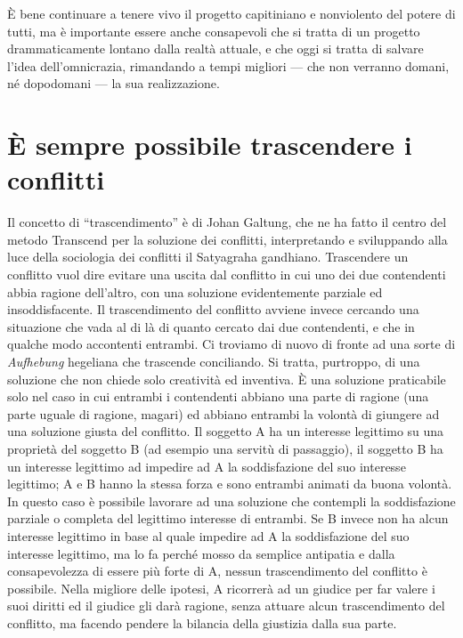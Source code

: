 \documentclass[12pt,oneside,openany]{book}
\begin{document}
È bene continuare a tenere vivo il progetto capitiniano e nonviolento del potere di tutti, ma è importante essere anche consapevoli che si tratta di un progetto drammaticamente lontano dalla realtà attuale, e che oggi si tratta di salvare l'idea dell'omnicrazia, rimandando a tempi migliori --- che non verranno domani, né dopodomani --- la sua realizzazione.

\setcounter{chapter}{8}\addtocounter{chapter}{-1}

\chapter{È sempre possibile trascendere i conflitti}

Il concetto di ``trascendimento'' è di Johan Galtung, che ne ha fatto il centro del metodo Transcend per la soluzione dei conflitti, interpretando e sviluppando alla luce della sociologia dei conflitti il Satyagraha gandhiano. Trascendere un conflitto vuol dire evitare una uscita dal conflitto in cui uno dei due contendenti abbia ragione dell'altro, con una soluzione evidentemente parziale ed insoddisfacente. Il trascendimento del conflitto avviene invece cercando una situazione che vada al di là di quanto cercato dai due contendenti, e che in qualche modo accontenti entrambi. Ci troviamo di nuovo di fronte ad una sorte di \emph{Aufhebung} hegeliana che trascende conciliando. Si tratta, purtroppo, di una soluzione che non chiede solo creatività ed inventiva. È una soluzione praticabile solo nel caso in cui entrambi i contendenti abbiano una parte di ragione (una parte uguale di ragione, magari) ed abbiano entrambi la volontà di giungere ad una soluzione giusta del conflitto. Il soggetto A ha un interesse legittimo su una proprietà del soggetto B (ad esempio una servitù di passaggio), il soggetto B ha un interesse legittimo ad impedire ad A la soddisfazione del suo interesse legittimo; A e B hanno la stessa forza e sono entrambi animati da buona volontà. In questo caso è possibile lavorare ad una soluzione che contempli la soddisfazione parziale o completa del legittimo interesse di entrambi. Se B invece non ha alcun interesse legittimo in base al quale impedire ad A la soddisfazione del suo interesse legittimo, ma lo fa perché mosso da semplice antipatia e dalla consapevolezza di essere più forte di A, nessun trascendimento del conflitto è possibile. Nella migliore delle ipotesi, A ricorrerà ad un giudice per far valere i suoi diritti ed il giudice gli darà ragione, senza attuare alcun trascendimento del conflitto, ma facendo pendere la bilancia della giustizia dalla sua parte.
\end{document}
